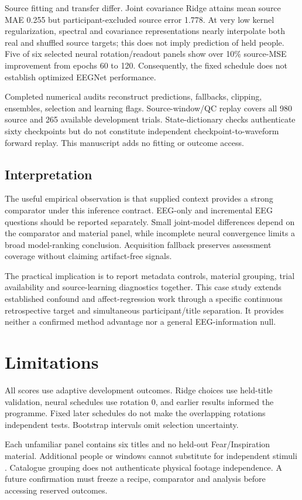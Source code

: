 \documentclass[11pt,a4paper]{article}
\begin{document}
Source fitting and transfer differ. Joint covariance Ridge attains mean source MAE 0.255 but participant-excluded source error 1.778. At very low kernel regularization, spectral and covariance representations nearly interpolate both real and shuffled source targets; this does not imply prediction of held people. Five of six selected neural rotation/readout panels show over 10\% source-MSE improvement from epochs 60 to 120. Consequently, the fixed schedule does not establish optimized EEGNet performance.

Completed numerical audits reconstruct predictions, fallbacks, clipping, ensembles, selection and learning flags. Source-window/QC replay covers all 980 source and 265 available development trials. State-dictionary checks authenticate sixty checkpoints but do not constitute independent checkpoint-to-waveform forward replay. This manuscript adds no fitting or outcome access.

\subsection*{Interpretation}
The useful empirical observation is that supplied context provides a strong comparator under this inference contract. EEG-only and incremental EEG questions should be reported separately. Small joint-model differences depend on the comparator and material panel, while incomplete neural convergence limits a broad model-ranking conclusion. Acquisition fallback preserves assessment coverage without claiming artifact-free signals.

The practical implication is to report metadata controls, material grouping, trial availability and source-learning diagnostics together. This case study extends established confound and affect-regression work through a specific continuous retrospective target and simultaneous participant/title separation. It provides neither a confirmed method advantage nor a general EEG-information null.

\section*{Limitations}
All scores use adaptive development outcomes. Ridge choices use held-title validation, neural schedules use rotation 0, and earlier results informed the programme. Fixed later schedules do not make the overlapping rotations independent tests. Bootstrap intervals omit selection uncertainty.

Each unfamiliar panel contains six titles and no held-out Fear/Inspiration material. Additional people or windows cannot substitute for independent stimuli \cite{westfall2014power}. Catalogue grouping does not authenticate physical footage independence. A future confirmation must freeze a recipe, comparator and analysis before accessing reserved outcomes.
\end{document}
